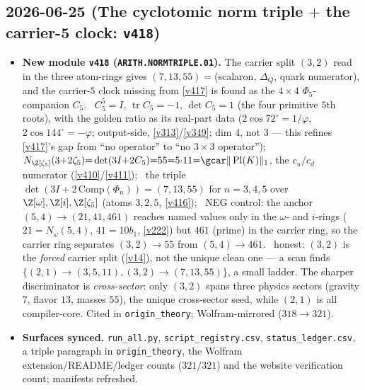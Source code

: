 \subsection*{2026-06-25 (The cyclotomic norm triple $+$ the carrier-5 clock: \texttt{v418})}
\begin{itemize}
\item \textbf{New module \texttt{v418} (\texttt{ARITH.NORMTRIPLE.01}).} The carrier split $(3,2)$ read in
the three atom-rings gives $(7,13,55)=$(scalaron, $\Delta_Q$, quark numerator), and the carrier-$5$ clock
missing from \vref{v417} is found as the $4{\times}4$ $\Phi_5$-companion $C_5$. \mE\ $C_5^5{=}I$,
$\operatorname{tr}C_5{=}{-}1$, $\det C_5{=}1$ (the four primitive $5$th roots), with the golden ratio as its
real-part data ($2\cos72^\circ{=}1/\varphi$, $2\cos144^\circ{=}{-}\varphi$; output-side, \vref{v313}/\vref{v349};
dim $4$, not $3$ --- this refines \vref{v417}'s gap from ``no operator'' to ``no $3{\times}3$ operator''); \mE\
$N_{\Z[\zeta_5]}(3{+}2\zeta_5){=}\det(3I{+}2C_5){=}55{=}5{\cdot}11{=}\gcar\|\operatorname{Pl}(K)\|_1$, the
$c_u/c_d$ numerator (\vref{v410}/\vref{v411}); \mE\ the triple $\det(3I{+}2\,\mathrm{Comp}(\Phi_n))=(7,13,55)$
for $n{=}3,4,5$ over $\Z[\omega],\Z[i],\Z[\zeta_5]$ (atoms $3,2,5$, \vref{v416}); \mE\ NEG control: the anchor
$(5,4)\to(21,41,461)$ reaches named values only in the $\omega$- and $i$-rings ($21{=}N_\omega(5,4)$,
$41{=}10b_1$, \vref{v222}) but $461$ (prime) in the carrier ring, so the carrier ring separates
$(3,2)\to55$ from $(5,4)\to461$. \mC\ honest: $(3,2)$ is the \emph{forced} carrier split (\vref{v14}), not the
unique clean one --- a scan finds $\{(2,1)\to(3,5,11),(3,2)\to(7,13,55)\}$, a small ladder. The sharper discriminator is
\emph{cross-sector}: only $(3,2)$ spans three physics sectors (gravity $7$, flavor $13$, masses $55$),
the unique cross-sector seed, while $(2,1)$ is all compiler-core. Cited in
\texttt{origin\_theory}; Wolfram-mirrored ($318\to321$).
\item \textbf{Surfaces synced.} \texttt{run\_all.py}, \texttt{script\_registry.csv},
\texttt{status\_ledger.csv}, a triple paragraph in \texttt{origin\_theory}, the Wolfram
extension/README/ledger counts ($321/321$) and the website verification count; manifests refreshed.
\end{itemize}


